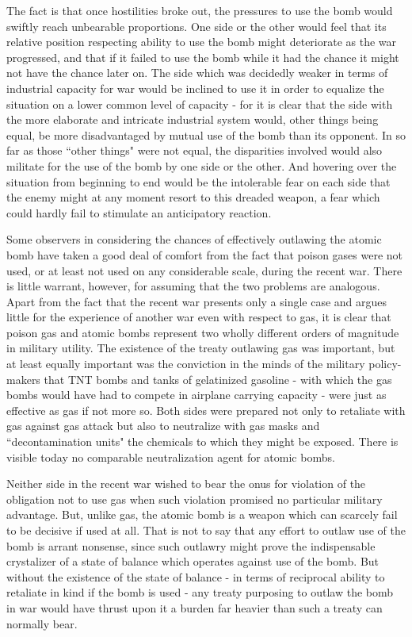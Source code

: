 The fact is that once hostilities broke out, the pressures to use the bomb would swiftly reach unbearable proportions. One side or the other would feel that its relative position respecting ability to use the bomb might deteriorate as the war progressed, and that if it failed to use the bomb while it had the chance it might not have the chance later on. The side which was decidedly weaker in terms of industrial capacity for war would be inclined to use it in order to equalize the situation on a lower common level of capacity - for it is clear that the side with the more elaborate and intricate industrial system would, other things being equal, be more disadvantaged by mutual use of the bomb than its opponent. In so far as those ``other things" were not equal, the disparities involved would also militate for the use of the bomb by one side or the other. And hovering over the situation from beginning to end would be the intolerable fear on each side that the enemy might at any moment resort to this dreaded weapon, a fear which could hardly fail to stimulate an anticipatory reaction.

Some observers in considering the chances of effectively outlawing the atomic bomb have taken a good deal of comfort from the fact that poison gases were not used, or at least not used on any considerable scale, during the recent war. There is little warrant, however, for assuming that the two problems are analogous. Apart from the fact that the recent war presents only a single case and argues little for the experience of another war even with respect to gas, it is clear that poison gas and atomic bombs represent two wholly different orders of magnitude in military utility. The existence of the treaty outlawing gas was important, but at least equally important was the conviction in the minds of the military policy-makers that TNT bombs and tanks of gelatinized gasoline - with which the gas bombs would have had to compete in airplane carrying capacity - were just as effective as gas if not more so. Both sides were prepared not only to retaliate with gas against gas attack but also to neutralize with gas masks and ``decontamination units" the chemicals to which they might be exposed. There is visible today no comparable neutralization agent for atomic bombs.

Neither side in the recent war wished to bear the onus for violation of the obligation not to use gas when such violation promised no particular military advantage. But, unlike gas, the atomic bomb is a weapon which can scarcely fail to be decisive if used at all. That is not to say that any effort to outlaw use of the bomb is arrant nonsense, since such outlawry might prove the indispensable crystalizer of a state of balance which operates against use of the bomb. But without the existence of the state of balance - in terms of reciprocal ability to retaliate in kind if the bomb is used - any treaty purposing to outlaw the bomb in war would have thrust upon it a burden far heavier than such a treaty can normally bear.

